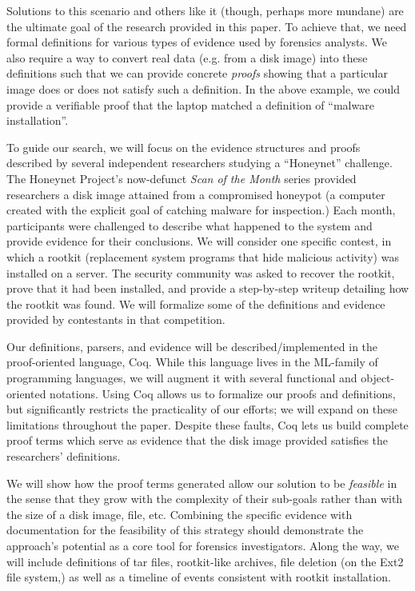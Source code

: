 \documentclass[nocopyrightspace]{sigplanconf}
\begin{document}
Solutions to this scenario and others like it (though, perhaps more mundane)
are the ultimate goal of the research provided in this paper. To achieve that,
we need formal definitions for various types of evidence used by forensics
analysts.  We also require a way to convert real data (e.g. from a disk image)
into these definitions such that we can provide concrete {\em proofs} showing
that a particular image does or does not satisfy such a definition. In the
above example, we could provide a verifiable proof that the laptop matched a
definition of ``malware installation''. 

To guide our search, we will focus on the evidence structures and proofs
described by several independent researchers studying a ``Honeynet''
challenge. The Honeynet Project\cite{honeynet}'s now-defunct {\it Scan of the
Month} series provided researchers a disk image attained from a compromised
honeypot (a computer created with the explicit goal of catching malware for
inspection.) Each month, participants were challenged to describe what
happened to the system and provide evidence for their conclusions. We will
consider one specific contest\cite{honeynet-15}, in which a rootkit
(replacement system programs that hide malicious activity) was installed on a
server. The security community was asked to recover the rootkit, prove that it
had been installed, and provide a step-by-step writeup detailing how the
rootkit was found. We will formalize some of the definitions and evidence
provided by contestants in that competition.

Our definitions, parsers, and evidence will be described/implemented in the
proof-oriented language, Coq. While this language lives in the ML-family of
programming languages, we will augment it with several functional and
object-oriented notations. Using Coq allows us to formalize our proofs and
definitions, but significantly restricts the practicality of our efforts; we
will expand on these limitations throughout the paper. Despite these faults,
Coq lets us build complete proof terms which serve as evidence that the disk
image provided satisfies the researchers' definitions.

We will show how the proof terms generated allow our solution to be {\em
feasible} in the sense that they grow with the complexity of their sub-goals
rather than with the size of a disk image, file, etc. Combining the specific
evidence with documentation for the feasibility of this strategy should
demonstrate the approach's potential as a core tool for forensics
investigators. Along the way, we will include definitions of tar files,
rootkit-like archives, file deletion (on the Ext2 file system,) as well as a
timeline of events consistent with rootkit installation.
\end{document}
